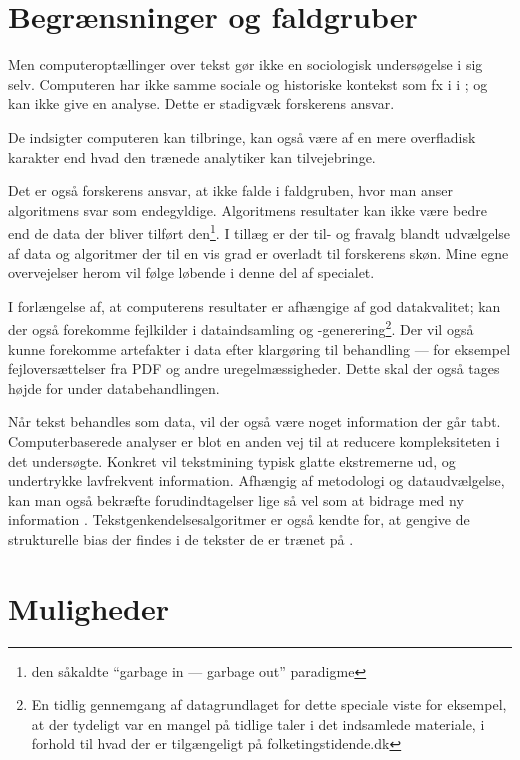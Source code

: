 \section{Begrænsninger og faldgruber}

Men computeroptællinger over tekst gør ikke en sociologisk undersøgelse i sig selv.
Computeren har ikke samme sociale og historiske kontekst som fx i \citeauthor{juulDiskurserOmUngdom2013} i ; og kan ikke give en analyse.
Dette er stadigvæk forskerens ansvar.

De indsigter computeren kan tilbringe, kan også være af en mere overfladisk karakter end hvad den trænede analytiker kan tilvejebringe.

Det er også forskerens ansvar, at ikke falde i faldgruben, hvor man anser algoritmens svar som endegyldige.
Algoritmens resultater kan ikke være bedre end de data der bliver tilført den\footnote{den såkaldte “garbage in — garbage out” paradigme}.
I tillæg er der til- og fravalg blandt udvælgelse af data og algoritmer der til en vis grad er overladt til forskerens skøn.
Mine egne overvejelser herom vil følge løbende i denne del af specialet.

I forlængelse af, at computerens resultater er afhængige af god datakvalitet; kan der også forekomme fejlkilder i dataindsamling og -generering\footnote{
En tidlig gennemgang af datagrundlaget for dette speciale viste for eksempel, at der tydeligt var en mangel på tidlige taler i det indsamlede materiale, i forhold til hvad der er tilgængeligt på folketingstidende.dk}.
Der vil også kunne forekomme artefakter i data efter klargøring til behandling --- for eksempel fejloversættelser fra PDF og andre uregelmæssigheder.
Dette skal der også tages højde for under databehandlingen.

Når tekst behandles som data, vil der også være noget information der går tabt.
Computerbaserede analyser er blot en anden vej til at reducere kompleksiteten i det undersøgte.
Konkret vil tekstmining typisk glatte ekstremerne ud, og undertrykke lavfrekvent information.
Afhængig af metodologi og dataudvælgelse, kan man også bekræfte forudindtagelser lige så vel som at bidrage med ny information \autocite[s. 15]{kwartlerTextMiningPractice2017}.
Tekstgenkendelsesalgoritmer er også kendte for, at gengive de strukturelle bias der findes i de tekster de er trænet på \autocite{kiritchenkoExaminingGenderRace2018}.

\section{Muligheder}

